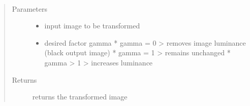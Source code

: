 \documentclass[letterpaper,10pt,english]{sphinxmanual}
\begin{document}
\begin{fulllineitems}
\label{\detokenize{ida_lib.operations:ida_lib.operations.pixel_ops_functional.change_gamma}}~\begin{quote}\begin{description}
\item[{Parameters}] \leavevmode\begin{itemize}
\item {} 
 \textendash{} input image to be transformed

\item {} 
 \textendash{} desired factor gamma
* gamma = 0 \sphinxhyphen{}\textgreater{} removes image luminance (black output image)
* gamma = 1 \sphinxhyphen{}\textgreater{} remains unchanged
* gamma \textgreater{} 1 \sphinxhyphen{}\textgreater{} increases luminance

\end{itemize}

\item[{Returns}] \leavevmode
returns the transformed image

\end{description}\end{quote}

\end{fulllineitems}

\end{document}
